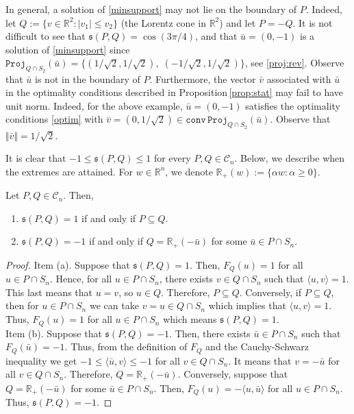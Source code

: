 \documentclass[hidelinks,onefignum,onetabnum]{siamart250211}
\theoremstyle{definition}
\theoremstyle{remark}
\newcommand{\R}{\mathbb R}
\newcommand{\bv}{\bar{v}}
\newcommand{\bu}{\bar{u}}
\newcommand{\proj}{\mathtt{Proj}}
\begin{document}
\begin{remark}\label{rembd}
In general, a solution of \eqref{minsupport} may not lie on the boundary of $P$. Indeed, let $Q:=\{v\in\R^2: |v_1|\leq v_2\}$ (the Lorentz cone in $\R^2$) and let $P=-Q$. It is not difficult to see that $\mathfrak{s}(P,Q)=\cos(3\pi/4)$, and that $\bu=(0,-1)$ is a solution of \eqref{minsupport} since  $\proj_{Q\cap S_2}(\bu)=\{(1/\sqrt{2},1/\sqrt{2}),\;(-1/\sqrt{2},1/\sqrt{2})\}$, see \eqref{proj:rev}. Observe that $\bu$ is not in the boundary of $P$. Furthermore, the vector $\bv$ associated with $\bu$ in the optimality conditions described in Proposition\,\ref{prop:stat} may fail to have unit norm. Indeed, for the above example, $\bu=(0,-1)$ satisfies the optimality conditions \eqref{optim} with $\bv=(0,1/\sqrt{2})\in \mathtt{conv\,}\proj_{Q\cap S_2}(\bu)$. Observe that $\Vert \bv\Vert=1/\sqrt{2}.$
\end{remark}

It is clear that $-1\leq\mathfrak{s}(P,Q)\leq 1$ for every $P,Q\in\mathcal C_n$. Below, we describe when the extremes are attained. For $w\in\R^n$, we denote $\R_+ (w):=\{\alpha w:\alpha\geq 0\}$.
\begin{proposition}\label{prop:extreme}
Let $P,Q\in\mathcal C_n$. Then,
\begin{enumerate}
\item[(a)] $\mathfrak{s}(P,Q)=1$ if and only if $P\subseteq Q$.
\item[(b)] $\mathfrak{s}(P,Q)=-1$ if and only if $Q=\R_+(-\bu)$ for some $\bu\in P\cap S_n$.
\end{enumerate}
\end{proposition}
\begin{proof}
Item (a). Suppose that $\mathfrak{s}(P,Q)=1$. Then, $F_Q(u)=1$ for all $u\in P\cap S_n$. Hence, for all $u\in P\cap S_n$, there exists $v\in Q\cap S_n$ such that $\langle u,v\rangle =1$. This last means that $u=v$, so $u\in Q$. Therefore, $P\subseteq Q$. Conversely, if $P\subseteq Q$, then for $u\in P\cap S_n$ we can take $v=u\in Q\cap S_n$ which implies that $\langle u,v\rangle=1$. Thus, $F_Q(u)=1$ for all $u\in P\cap S_n$ which means $\mathfrak{s}(P,Q)=1$.\\
Item (b). Suppose that $\mathfrak{s}(P,Q)=-1$. Then, there exists $\bu\in P\cap S_n$ such that $F_Q(\bu)=-1$. Thus, from the definition of $F_Q$ and the Cauchy-Schwarz inequality we get $-1\leq \langle \bu,v\rangle\leq -1$ for all $v\in Q\cap S_n$. It means that $v=-\bu$ for all $v\in Q\cap S_n$. Therefore, $Q=\R_+(-\bu)$. Conversely, suppose that $Q=\R_+(-\bu)$ for some $\bu\in P\cap S_n$. Then, $F_Q(u)=-\langle u,\bu\rangle$ for all $u\in P\cap S_n$. Thus, $\mathfrak{s}(P,Q)=-1$.
\end{proof}
\end{document}
